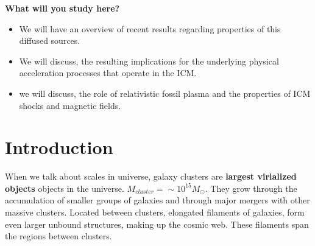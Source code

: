\documentclass[11pt]{report}
\begin{document}
\textbf{What will you study here?}\\
\begin{itemize}
\item We will have an overview of recent results regarding properties of this diffused sources.
\item We will discuss, the resulting implications for the underlying physical acceleration processes that operate in the ICM.
\item we will discuss, the role of relativistic fossil plasma and the properties of ICM shocks and magnetic fields.
\end{itemize}
\newpage
\section{Introduction}
When we talk about scales in universe, galaxy clusters are \textbf{largest virialized objects} objects in the universe. $M_{cluster}=\sim 10^{15} M_\odot$. They grow through the accumulation of smaller groups of galaxies and through major mergers with other massive clusters. Located between clusters, elongated filaments of galaxies, form even larger unbound structures, making up the cosmic web. These filaments span the regions between clusters. 
\end{document}

